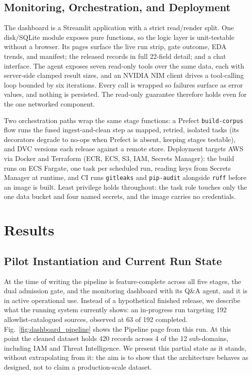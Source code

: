 \documentclass[conference]{IEEEtran}
\begin{document}
\subsection{Monitoring, Orchestration, and Deployment}

The dashboard is a Streamlit application with a strict read/render
split. One disk/SQLite module exposes pure functions, so the logic layer
is unit-testable without a browser. Its pages surface the live run
strip, gate outcome, EDA trends, and manifest; the released records in
full 22-field detail; and a chat interface. The agent exposes seven
read-only tools over the same data, each with server-side clamped result
sizes, and an NVIDIA NIM client drives a tool-calling loop
\cite{schick2023toolformer} bounded by six iterations. Every call is
wrapped so failures surface as error values, and nothing is persisted.
The read-only guarantee therefore holds even for the one networked
component.

Two orchestration paths wrap the same stage functions: a Prefect
\texttt{build-corpus} flow runs the fused ingest-and-clean step as
mapped, retried, isolated tasks (its decorators degrade to no-ops when
Prefect is absent, keeping stages testable), and DVC versions each
release against a remote store. Deployment targets AWS via Docker and
Terraform (ECR, ECS, S3, IAM, Secrets Manager): the build runs on ECS
Fargate, one task per scheduled run, reading keys from Secrets Manager at
runtime, and CI runs \texttt{gitleaks} and \texttt{pip-audit} alongside
\texttt{ruff} before an image is built. Least privilege holds
throughout: the task role touches only the one data bucket and four
named secrets, and the image carries no credentials.


\section{Results}

\subsection{Pilot Instantiation and Current Run State}

At the time of writing the pipeline is feature-complete across all five
stages, the dual admission gate, and the monitoring dashboard with its
Q\&A agent, and it is in active operational use. Instead of a
hypothetical finished release, we describe what the running system
currently shows: an in-progress run targeting 192 allowlist-catalogued
sources, observed at 63 of 192 completed. Fig.~\ref{fig:dashboard_pipeline}
shows the Pipeline page from this run. At this point the cleaned dataset
holds 420 records across 4 of the 12 sub-domains, including IAM and
Threat Intelligence. We present this partial state as it stands, without
extrapolating from it: the aim is to show that the architecture behaves
as designed, not to claim a production-scale dataset.
\end{document}
